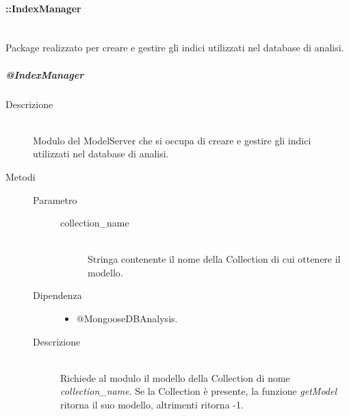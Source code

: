 \paragraph{::IndexManager} \hfill \\
Package realizzato per creare e gestire gli indici utilizzati nel database di analisi.
\subparagraph{@IndexManager} \hfill
\begin{description}
 \item[Descrizione] \hfill \\
 Modulo del ModelServer che si occupa di creare e gestire gli indici utilizzati nel database di analisi. 
 \item[Metodi]
  \begin{mldescription}
	\begin{description}
	 \item[Parametro] \hfill
	  \begin{description}
	   \item[collection\_name] \hfill \\
	   Stringa contenente il nome della Collection di cui ottenere il modello.
	  \end{description}
	 \item[Dipendenza] \hfill
	  \begin{itemize}
	   \item @MongooseDBAnalysis.
	  \end{itemize}
	 \item[Descrizione] \hfill \\
	 Richiede al modulo  il modello della Collection di nome \textit{collection\_name}. Se la Collection è presente, la funzione \textit{getModel} ritorna il suo modello, altrimenti ritorna -1.
	\end{description}	    
    

\end{mldescription}
\end{description}
